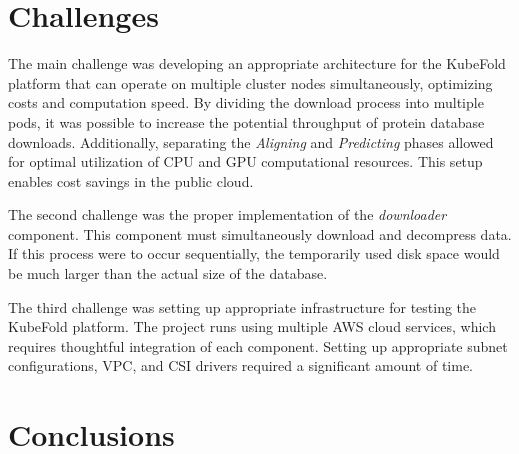 \section{Challenges}

The main challenge was developing an appropriate architecture for the KubeFold platform that can operate on multiple cluster nodes simultaneously, optimizing costs and computation speed.
By dividing the download process into multiple pods, it was possible to increase the potential throughput of protein database downloads.
Additionally, separating the \textit{Aligning} and \textit{Predicting} phases allowed for optimal utilization of CPU and GPU computational resources.
This setup enables cost savings in the public cloud.

The second challenge was the proper implementation of the \textit{downloader} component.
This component must simultaneously download and decompress data.
If this process were to occur sequentially, the temporarily used disk space would be much larger than the actual size of the database.

The third challenge was setting up appropriate infrastructure for testing the KubeFold platform.
The project runs using multiple AWS cloud services, which requires thoughtful integration of each component.
Setting up appropriate subnet configurations, VPC, and CSI drivers required a significant amount of time.

\section{Conclusions}